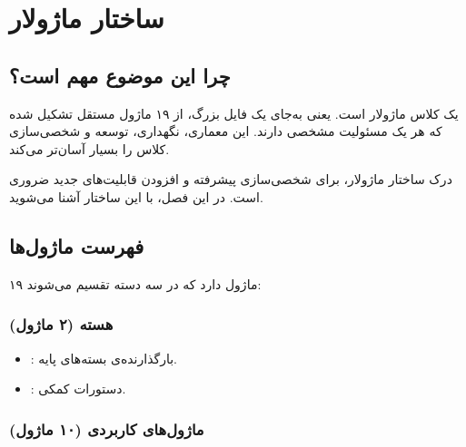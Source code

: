 
\chapter{ساختار ماژولار}
\label{chap:modules}

\section{چرا این موضوع مهم است؟}
\label{sec:modules-why}

 یک کلاس ماژولار است. یعنی
به‌جای یک فایل بزرگ، از ۱۹ ماژول مستقل
تشکیل شده که هر یک مسئولیت مشخصی دارند.
این معماری، نگهداری، توسعه و شخصی‌سازی
کلاس را بسیار آسان‌تر می‌کند.

درک ساختار ماژولار، برای شخصی‌سازی پیشرفته
و افزودن قابلیت‌های جدید ضروری است. در این
فصل، با این ساختار آشنا می‌شوید.


\section{فهرست ماژول‌ها}
\label{sec:modules-list}

 ۱۹ ماژول دارد که در سه دسته
تقسیم می‌شوند:

\subsection{هسته (۲ ماژول)}
\label{sec:modules-core}

\begin{itemize}
    \item {}: بارگذارنده‌ی
    بسته‌های پایه.
    \item {}: دستورات کمکی.
\end{itemize}

\subsection{ماژول‌های کاربردی (۱۰ ماژول)}
\label{sec:modules-feature}

